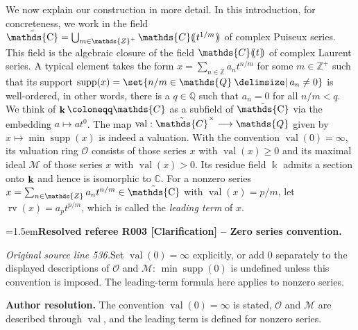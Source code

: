 \documentclass[12pt]{amsart}
\newcommand{\ResolvedRefereeRemark}[5]{%
  \par\medskip\begingroup\normalfont\small\color{gray}%
  \emergencystretch=1.5em\noindent\textbf{Resolved referee R#1 [#2] -- #3.}\par\nobreak\noindent #4\par
  \medskip\color{ResolutionGreen}\noindent\textbf{Author resolution.} #5\par
  \endgroup\medskip
}
\newcommand{\memph}[1]{{\color{magenta}\emph{#1}}}
\theoremstyle{plain}
\theoremstyle{definition}
\theoremstyle{remark}
\numberwithin{equation}{section}
\theoremstyle{plain}
\newcommand{\MM}{\mdl M}
\newcommand{\OO}{\mdl O}
\DeclareMathOperator{\supp}{supp}
\DeclareMathOperator{\K}{\mathds{k}}
\newcommand{\Z}{\mathds{Z}}
\newcommand{\C}{\mathds{C}}
\newcommand{\Q}{\mathds{Q}}
\newcommand{\0}{\emptyset}
\newcommand{\dpar}[1]{%
   (\mkern-4mu (#1 )\mkern-4mu )}
\newcommand{\mdl}[1]{\mathcal{#1}}  %
\newcommand{\fun}{\longrightarrow}
\newcommand{\efun}{\longmapsto}
\newcommand{\mi}{\smallsetminus}
\providecommand\given{}
\newcommand\SetSymbol[1][]{%
\nonscript \: #1 \vert
\allowbreak
\nonscript\:
\mathopen{}}
\renewcommand\given{\SetSymbol[\delimsize]}
\DeclareMathOperator{\rv}{rv}
\DeclareMathOperator{\vv}{val}
\DeclareMathOperator{\gsk}{\mathbf{K}_+}
\DeclareMathOperator{\ggk}{\mathbf{K}}
\DeclareMathOperator{\bfk}{\bf k}
\DeclareMathOperator{\puC}{\tilde \C}
\begin{document}
We now explain our construction in more detail.
In this introduction, for concreteness, we work in  the field $\puC = \bigcup_{m \in \Z^+} \C \dpar{ t^{1 / m} }$ of complex Puiseux series. This field is the algebraic closure of the field $\C \dpar t$ of complex Laurent series. A typical element  takes the form $x = \sum_{n \in \Z} a_n t^{n/m}$ for some $m \in \Z^+$ such that its support $\supp(x) = \set{n/m \in \Q \given a_n \neq 0 }$ is well-ordered, in other words, there is a $q \in \Q$ such that $a_n = 0$ for all $n/m < q$. We think of $\bfk \coloneqq \C$ as a subfield of $\puC$ via the embedding $a \efun at^0$. The map $\vv: \tilde \C^\times \fun \Q$ given by $x \efun \min\supp(x)$ is indeed a valuation. With the convention $\vv(0) = \infty$, its valuation ring $\OO$ consists of those series $x$ with $\vv(x) \geq 0$ and its maximal ideal $\MM$ of those series $x$ with $\vv(x) > 0$. Its residue field $\K$ admits a section onto $\bfk$ and hence is isomorphic to $\C$. For a nonzero series $x = \sum_{n \in \Z} a_n t^{n/m} \in \puC$ with $\vv(x) = p/m$, let $\rv(x) = a_p t^{p/m}$, which is called the \memph{leading term} of $x$.

\ResolvedRefereeRemark{003}{Clarification}{Zero series convention}{%
\textit{Original source line 536.}\quad Set $\vv(0)=\infty$ explicitly, or add $0$ separately to the displayed descriptions of $\OO$ and $\MM$: $\min\supp(0)$ is undefined unless this convention is imposed. The leading-term formula here applies to nonzero series.
}{The convention $\vv(0)=\infty$ is stated, $\OO$ and $\MM$ are described through $\vv$, and the leading term is defined for nonzero series.}
\end{document}
